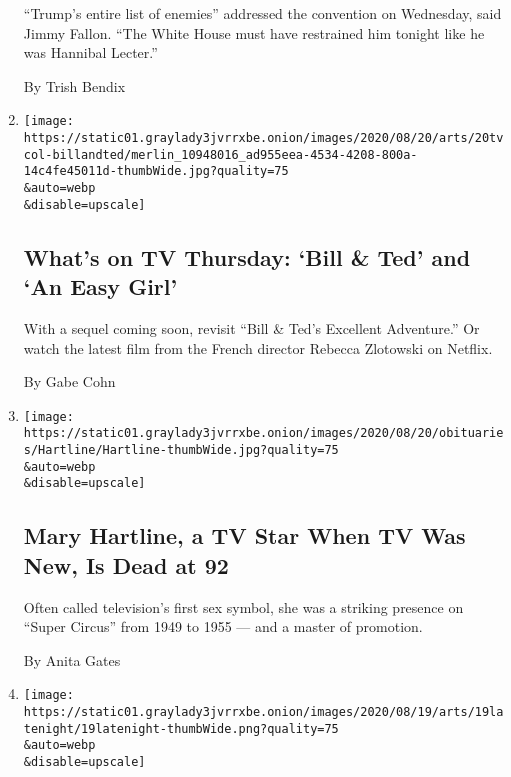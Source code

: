 \begin{enumerate}
  ``Trump's entire list of enemies'' addressed the convention on
  Wednesday, said Jimmy Fallon. ``The White House must have restrained
  him tonight like he was Hannibal Lecter.''

  By Trish Bendix
\item
  \href{/2020/08/20/arts/television/whats-on-tv-thursday-bill-ted-and-an-easy-girl.html}{}

  \texttt{[image: https://static01.graylady3jvrrxbe.onion/images/2020/08/20/arts/20tvcol-billandted/merlin\_10948016\_ad955eea-4534-4208-800a-14c4fe45011d-thumbWide.jpg?quality=75\\\&auto=webp\\\&disable=upscale]}

  \hypertarget{whats-on-tv-thursday-bill--ted-and-an-easy-girl}{%
  \subsection{What's on TV Thursday: `Bill \& Ted' and `An Easy
  Girl'}\label{whats-on-tv-thursday-bill--ted-and-an-easy-girl}}

  With a sequel coming soon, revisit ``Bill \& Ted's Excellent
  Adventure.'' Or watch the latest film from the French director Rebecca
  Zlotowski on Netflix.

  By Gabe Cohn
\item
  \href{/2020/08/19/arts/television/mary-hartline-dead.html}{}

  \texttt{[image: https://static01.graylady3jvrrxbe.onion/images/2020/08/20/obituaries/Hartline/Hartline-thumbWide.jpg?quality=75\\\&auto=webp\\\&disable=upscale]}

  \hypertarget{mary-hartline-a-tv-star-when-tv-was-new-is-dead-at-92}{%
  \subsection{Mary Hartline, a TV Star When TV Was New, Is Dead at
  92}\label{mary-hartline-a-tv-star-when-tv-was-new-is-dead-at-92}}

  Often called television's first sex symbol, she was a striking
  presence on ``Super Circus'' from 1949 to 1955 --- and a master of
  promotion.

  By Anita Gates
\item
  \href{/2020/08/19/arts/television/trevor-noah-michelle-obama-speech.html}{}

  \texttt{[image: https://static01.graylady3jvrrxbe.onion/images/2020/08/19/arts/19latenight/19latenight-thumbWide.png?quality=75\\\&auto=webp\\\&disable=upscale]}


\end{enumerate}
